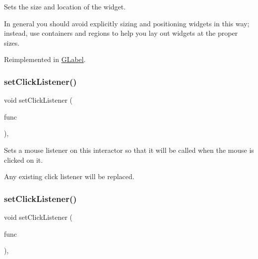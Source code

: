 Sets the size and location of the widget. 

In general you should avoid explicitly sizing and positioning widgets in this way; instead, use containers and regions to help you lay out widgets at the proper sizes. 

Reimplemented in \mbox{\hyperlink{classGLabel_adb836652705fdc4b7e90b7a3afc56a37}{G\+Label}}.

\mbox{\label{classGInteractor_abd40af6921242584d0954f173911b190}} 
\subsubsection{\texorpdfstring{set\+Click\+Listener()}{setClickListener()}\hspace{0.1cm}{\footnotesize\ttfamily [1/2]}}
{\footnotesize\ttfamily void set\+Click\+Listener (\begin{DoxyParamCaption}\item[{G\+Event\+Listener}]{func }\end{DoxyParamCaption})\hspace{0.3cm}{\ttfamily [virtual]}, {\ttfamily [inherited]}}



Sets a mouse listener on this interactor so that it will be called when the mouse is clicked on it. 

Any existing click listener will be replaced. \mbox{\label{classGInteractor_a856414c92df90f56f3877475eb3f8fc4}} 
\subsubsection{\texorpdfstring{set\+Click\+Listener()}{setClickListener()}\hspace{0.1cm}{\footnotesize\ttfamily [2/2]}}
{\footnotesize\ttfamily void set\+Click\+Listener (\begin{DoxyParamCaption}\item[{G\+Event\+Listener\+Void}]{func }\end{DoxyParamCaption})\hspace{0.3cm}{\ttfamily [virtual]}, {\ttfamily [inherited]}}



